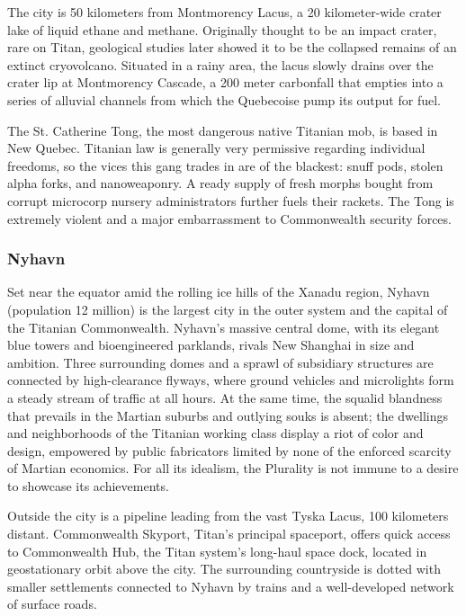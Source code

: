 The city is 50 kilometers from Montmorency Lacus, a 20 kilometer-wide
crater lake of liquid ethane and methane. Originally thought to be an
impact crater, rare on Titan, geological studies later showed it to be
the collapsed remains of an extinct cryovolcano. Situated in a rainy
area, the lacus slowly drains over the crater lip at Montmorency
Cascade, a 200 meter carbonfall that empties into a series of alluvial
channels from which the Quebecoise pump its output for fuel.

The St. Catherine Tong, the most dangerous native Titanian mob, is
based in New Quebec. Titanian law is generally very permissive
regarding individual freedoms, so the vices this gang trades in are of
the blackest: snuff pods, stolen alpha forks, and nanoweaponry.  A
ready supply of fresh morphs bought from corrupt microcorp nursery
administrators further fuels their rackets. The Tong is extremely
violent and a major embarrassment to Commonwealth security forces.

\subsubsection{Nyhavn}
\label{sec:nyhavn}

Set near the equator amid the rolling ice hills of the Xanadu region,
Nyhavn (population 12 million) is the largest city in the outer system
and the capital of the Titanian Commonwealth. Nyhavn's massive central
dome, with its elegant blue towers and bioengineered parklands, rivals
New Shanghai in size and ambition. Three surrounding domes and a
sprawl of subsidiary structures are connected by high-clearance
flyways, where ground vehicles and microlights form a steady stream of
traffic at all hours. At the same time, the squalid blandness that
prevails in the Martian suburbs and outlying souks is absent; the
dwellings and neighborhoods of the Titanian working class display a
riot of color and design, empowered by public fabricators limited by
none of the enforced scarcity of Martian economics.  For all its
idealism, the Plurality is not immune to a desire to showcase its
achievements.

Outside the city is a pipeline leading from the
vast Tyska Lacus, 100 kilometers distant. Commonwealth Skyport, Titan's principal spaceport, offers
quick access to Commonwealth Hub, the Titan system's long-haul space dock, located in geostationary
orbit above the city. The surrounding countryside
is dotted with smaller settlements connected to
Nyhavn by trains and a well-developed network of
surface roads.

